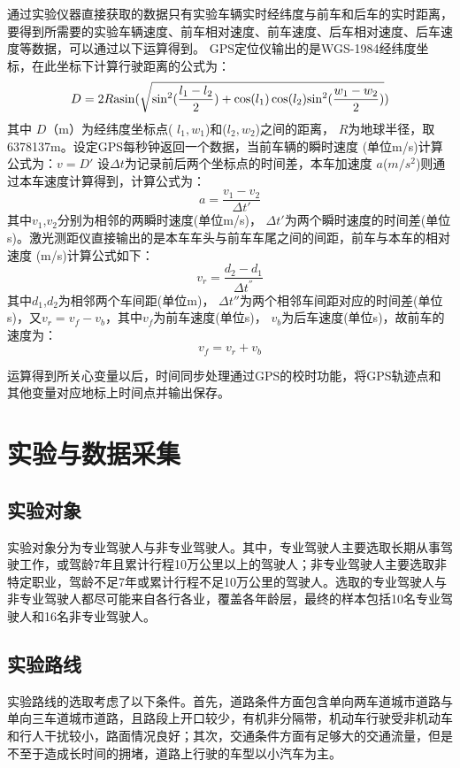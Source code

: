 通过实验仪器直接获取的数据只有实验车辆实时经纬度与前车和后车的实时距离，要得到所需要的实验车辆速度、前车相对速度、前车速度、后车相对速度、后车速度等数据，可以通过以下运算得到。
GPS定位仪输出的是WGS-1984经纬度坐标，在此坐标下计算行驶距离的公式为：
\begin{equation}
D = 2R{\rm{asin}}(\sqrt {\sin _{}^2(\frac{{{l_1} - {l_2}}}{2}) + \cos ({l_1})\cos ({l_2}){{\sin }^2}(\frac{{{w_1} - {w_2}}}{2})} )
\end{equation}
其中 $D$（m）为经纬度坐标点( ${l_1},{w_1}$)和(${l_2},{w_2}$)之间的距离， $R$为地球半径，取6378137m。设定GPS每秒钟返回一个数据，当前车辆的瞬时速度 (单位m/s)计算公式为：$v = D'$
设$\Delta t$为记录前后两个坐标点的时间差，本车加速度 $a$($m/s^2$)则通过本车速度计算得到，计算公式为：
\begin{equation}
a = \frac{{{v_1} - {v_2}}}{{\Delta t'}}
\end{equation}
其中$v_1$,$v_2$分别为相邻的两瞬时速度(单位m/s)， $\Delta {t'}$为两个瞬时速度的时间差(单位s)。激光测距仪直接输出的是本车车头与前车车尾之间的间距，前车与本车的相对速度 (m/s)计算公式如下：
\begin{equation}
{v_r} = \frac{{{d_2} - {d_1}}}{{\Delta {t^{''}}}}
\end{equation}
其中$d_1$,$d_2$为相邻两个车间距(单位m)， $\Delta t''$为两个相邻车间距对应的时间差(单位s)，又${v_r} = {v_f} - {v_b}$，其中${v_f}$为前车速度(单位s)， ${v_b}$为后车速度(单位s)，故前车的速度为：
\begin{equation}
{v_f} = {v_r} + {v_b}
\end{equation}

运算得到所关心变量以后，时间同步处理通过GPS的校时功能，将GPS轨迹点和其他变量对应地标上时间点并输出保存。

\section{实验与数据采集}
\subsection{实验对象}
实验对象分为专业驾驶人与非专业驾驶人。其中，专业驾驶人主要选取长期从事驾驶工作，或驾龄7年且累计行程10万公里以上的驾驶人；非专业驾驶人主要选取非特定职业，驾龄不足7年或累计行程不足10万公里的驾驶人。选取的专业驾驶人与非专业驾驶人都尽可能来自各行各业，覆盖各年龄层，最终的样本包括10名专业驾驶人和16名非专业驾驶人。
\subsection{实验路线}
实验路线的选取考虑了以下条件。首先，道路条件方面包含单向两车道城市道路与单向三车道城市道路，且路段上开口较少，有机非分隔带，机动车行驶受非机动车和行人干扰较小，路面情况良好；其次，交通条件方面有足够大的交通流量，但是不至于造成长时间的拥堵，道路上行驶的车型以小汽车为主。

